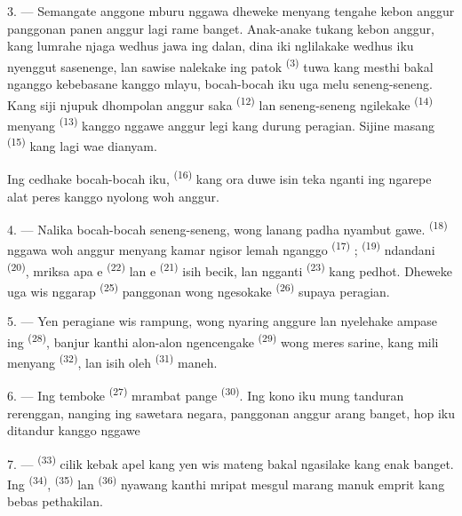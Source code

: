 3. --- Semangate anggone mburu nggawa dheweke menyang tengahe kebon
anggur panggonan panen anggur lagi rame banget. Anak-anake tukang
kebon anggur, kang lumrahe njaga wedhus jawa ing dalan, dina iki
nglilakake wedhus iku nyenggut sasenenge, lan sawise nalekake ing
patok  \textsuperscript{(3)} tuwa kang mesthi
bakal nganggo kebebasane kanggo mlayu, bocah-bocah iku uga melu
seneng-seneng. Kang siji njupuk dhompolan anggur saka  \textsuperscript{(12)} lan seneng-seneng ngilekake 
\textsuperscript{(14)} menyang  \textsuperscript{(13)}
kanggo nggawe anggur legi kang durung peragian. Sijine masang
 \textsuperscript{(15)} kang lagi wae dianyam.

Ing cedhake bocah-bocah iku, 
\textsuperscript{(16)} kang ora duwe isin teka nganti ing ngarepe alat
peres kanggo nyolong woh anggur.

4. --- Nalika bocah-bocah seneng-seneng, wong lanang padha nyambut
gawe.  \textsuperscript{(18)} nggawa woh anggur
menyang kamar ngisor lemah nganggo 
\textsuperscript{(17)} ;  \textsuperscript{(19)}
ndandani  \textsuperscript{(20)}, mriksa apa
e \textsuperscript{(22)} lan e
\textsuperscript{(21)} isih becik, lan ngganti 
\textsuperscript{(23)} kang pedhot. Dheweke uga wis nggarap  \textsuperscript{(25)} panggonan wong ngesokake  \textsuperscript{(26)} supaya peragian.

5. --- Yen peragiane wis rampung, wong nyaring anggure lan nyelehake
ampase ing  \textsuperscript{(28)}, banjur kanthi
alon-alon ngencengake  \textsuperscript{(29)} wong
meres sarine, kang mili menyang 
\textsuperscript{(32)}, lan isih oleh 
\textsuperscript{(31)} maneh.

\VUsaut{6.0mm}
\VUsaut{3.4mm}

6. --- Ing temboke  \textsuperscript{(27)}
mrambat pange  \textsuperscript{(30)}. Ing kono iku mung
tanduran rerenggan, nanging ing sawetara negara, panggonan anggur arang
banget, hop iku ditandur kanggo nggawe 

7. ---  \textsuperscript{(33)} cilik kebak apel kang
yen wis mateng bakal ngasilake  kang enak banget. Ing
 \textsuperscript{(34)}, 
\textsuperscript{(35)} lan  \textsuperscript{(36)}
nyawang kanthi mripat mesgul marang manuk emprit kang bebas pethakilan.


